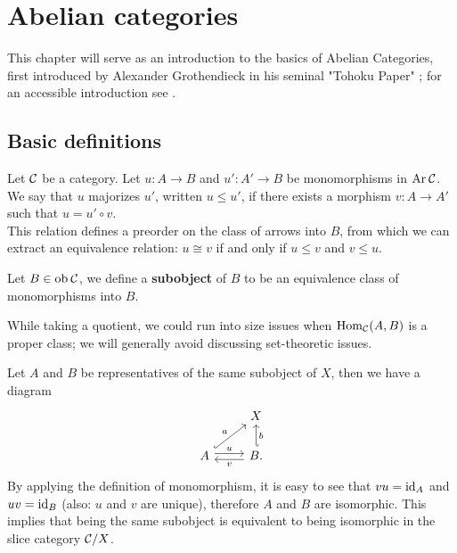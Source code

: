 
\chapter{Abelian categories}


This chapter will serve as an introduction to the basics of Abelian Categories, first introduced by Alexander Grothendieck in his seminal "Tohoku Paper" \cite{Tohoku}; for an accessible introduction see \cite{murfet2006abelian}.

\section{Basic definitions}
Let $\mathcal{C}$ be a category.
Let $u\colon A\longrightarrow B$ and $u'\colon A'\longrightarrow B$ be monomorphisms in $\text{Ar}\: \mathcal{C}$. We say that $u$ majorizes $u'$, written $u \leq u'$, if there exists a morphism $v:A \longrightarrow A'$ such that $u=u'\circ v$.\\
 This relation defines a preorder on the class of arrows into $B$, from which we can extract an equivalence relation: $u \cong v$ if and only if $u \leq v$ and $v \leq u$. 



\begin{definition}[Subobject]
	Let $B \in \mathrm{ob} \: \mathcal{C}$, we define a \textbf{subobject} of $B$ to be an equivalence class of monomorphisms into $B$.
\end{definition}

\begin{remark}
	While taking a quotient, we could run into size issues when $\mathrm{Hom}_{\mathcal{C}}(A,B)$ is a proper class; we will generally avoid discussing set-theoretic issues.
\end{remark}

\begin{remark}
	Let $A$ and $B$ be representatives of the same subobject of $X$, then we have a diagram
	\[\begin{tikzcd}
		& X \\
		A & {B.}
		\arrow["a", hook, from=2-1, to=1-2]
		\arrow["u", shift left, from=2-1, to=2-2]
		\arrow["b"', hook', from=2-2, to=1-2]
		\arrow["v", shift left, from=2-2, to=2-1]
	\end{tikzcd}\]
	By applying the definition of monomorphism, it is easy to see that $vu = \mathrm{id}_A$ and $uv = \mathrm{id}_B$ (also: $u$ and $v$ are unique), therefore $A$ and $B$ are isomorphic. This implies that being the same subobject is equivalent to being isomorphic in the slice category $\mathcal{C} / X$.
\end{remark}

